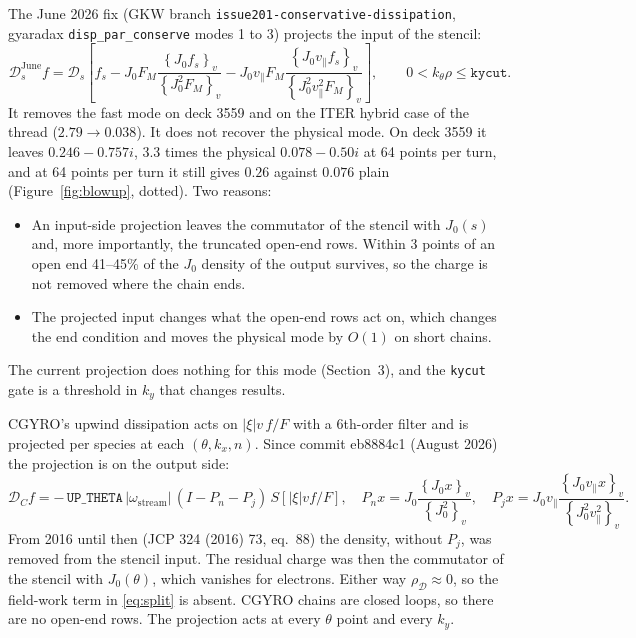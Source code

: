 \documentclass[10pt,a4paper]{article}
\makeatletter
\newcommand{\vint}[1]{\left\{#1\right\}_v}
\newcommand{\code}[1]{\texttt{#1}}
\renewcommand\section{\@startsection{section}{1}{\z@}{-1.6em plus -0.4em}{0.6em}{\sffamily\large\bfseries}}
\makeatother
\begin{document}
The June 2026 fix (GKW branch \code{issue201-conservative-dissipation}, gyaradax \code{disp\_par\_conserve} modes 1 to 3) projects the input of the stencil:
\begin{equation}
\mathcal D^{\mathrm{June}}_s f = \mathcal D_s\!\left[f_s - J_0 F_M\frac{\vint{J_0 f_s}}{\vint{J_0^2F_M}} - J_0 v_\parallel F_M\frac{\vint{J_0 v_\parallel f_s}}{\vint{J_0^2v_\parallel^2F_M}}\right], \qquad 0 < k_\theta\rho \le \code{kycut}.
\end{equation}
It removes the fast mode on deck 3559 and on the ITER hybrid case of the thread ($2.79\to0.038$). It does not recover the physical mode. On deck 3559 it leaves $0.246 - 0.757i$, 3.3 times the physical $0.078 - 0.50i$ at 64 points per turn, and at 64 points per turn it still gives $0.26$ against $0.076$ plain (Figure~\ref{fig:blowup}, dotted). Two reasons:
\begin{itemize}
\item An input-side projection leaves the commutator of the stencil with $J_0(s)$ and, more importantly, the truncated open-end rows. Within 3 points of an open end 41--45\% of the $J_0$ density of the output survives, so the charge is not removed where the chain ends.
\item The projected input changes what the open-end rows act on, which changes the end condition and moves the physical mode by $O(1)$ on short chains.
\end{itemize}
The current projection does nothing for this mode (Section~3), and the \code{kycut} gate is a threshold in $k_y$ that changes results.

\section{What CGYRO does}

CGYRO's upwind dissipation acts on $|\xi| v\, f/F$ with a 6th-order filter and is projected per species at each $(\theta, k_x, n)$. Since commit eb8884c1 (August 2026) the projection is on the output side:
\begin{equation}
\mathcal D_C f = -\,\code{UP\_THETA}\,|\omega_{\mathrm{stream}}|\,(I - P_n - P_j)\, S\!\left[|\xi| v f/F\right],\quad
P_n x = J_0 \frac{\vint{J_0 x}}{\vint{J_0^2}},\quad
P_j x = J_0 v_\parallel \frac{\vint{J_0 v_\parallel x}}{\vint{J_0^2 v_\parallel^2}} .
\end{equation}
From 2016 until then (JCP 324 (2016) 73, eq.~88) the density, without $P_j$, was removed from the stencil input. The residual charge was then the commutator of the stencil with $J_0(\theta)$, which vanishes for electrons. Either way $\rho_{\mathcal D}\approx0$, so the field-work term in \eqref{eq:split} is absent. CGYRO chains are closed loops, so there are no open-end rows. The projection acts at every $\theta$ point and every $k_y$.
\end{document}
